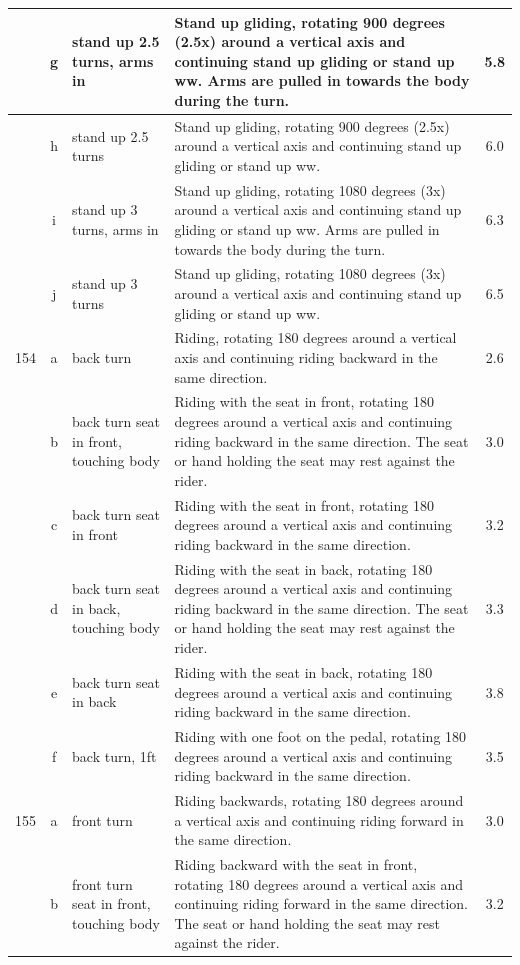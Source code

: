 \begin{longtable}{|r|c|p{4cm}|p{8cm}|c|}
\hline
  & g & stand up 2.5 turns, arms in & Stand up gliding, rotating 900 degrees (2.5x) around a vertical axis and continuing stand up gliding or stand up ww. Arms are pulled in towards the body during the turn. & 5.8 \\ 
\hline
  & h & stand up 2.5 turns  & Stand up gliding, rotating 900 degrees (2.5x) around a vertical axis and continuing stand up gliding or stand up ww.  & 6.0 \\ 
\hline
  & i & stand up 3 turns, arms in & Stand up gliding, rotating 1080 degrees (3x) around a vertical axis and continuing stand up gliding or stand up ww. Arms are pulled in towards the body during the turn.  & 6.3 \\ 
\hline
  & j & stand up 3 turns  & Stand up gliding, rotating 1080 degrees (3x) around a vertical axis and continuing stand up gliding or stand up ww. & 6.5 \\ 
\hline
154 & a & back turn & Riding, rotating 180 degrees around a vertical axis and continuing riding backward in the same direction. & 2.6 \\ 
\hline
  & b & back turn seat in front, touching body  & Riding with the seat in front, rotating 180 degrees around a vertical axis and continuing riding backward in the same direction. The seat or hand holding the seat may rest against the rider.  & 3.0 \\ 
\hline
  & c & back turn seat in front & Riding with the seat in front, rotating 180 degrees around a vertical axis and continuing riding backward in the same direction.  & 3.2 \\ 
\hline
  & d & back turn seat in back, touching body & Riding with the seat in back, rotating 180 degrees around a vertical axis and continuing riding backward in the same direction. The seat or hand holding the seat may rest against the rider. & 3.3 \\ 
\hline
  & e & back turn seat in back  & Riding with the seat in back, rotating 180 degrees around a vertical axis and continuing riding backward in the same direction. & 3.8 \\ 
\hline
  & f & back turn, 1ft  & Riding with one foot on the pedal, rotating 180 degrees around a vertical axis and continuing riding backward in the same direction.  & 3.5 \\ 
\hline
155 & a & front turn  & Riding backwards, rotating 180 degrees around a vertical axis and continuing riding forward in the same direction.  & 3.0 \\ 
\hline
  & b & front turn seat in front, touching body & Riding backward with the seat in front, rotating 180 degrees around a vertical axis and continuing riding forward in the same direction. The seat or hand holding the seat may rest against the rider.  & 3.2 \\ 

\end{longtable}
